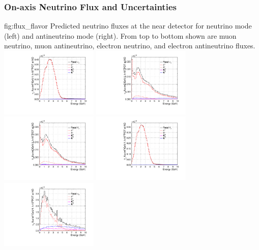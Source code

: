 \subsubsection{On-axis Neutrino Flux and Uncertainties}

\begin{dunefigure}{fig:flux_flavor}
{Predicted neutrino fluxes at the near detector for neutrino mode (left) and antineutrino mode (right). From top to bottom shown are muon neutrino, muon antineutrino, electron neutrino, and electron antineutrino fluxes.}
    \includegraphics[width=0.35\textwidth]{graphics/dune_neutrino_nd_numu.pdf}
     \includegraphics[width=0.35\textwidth]{graphics/dune_antineutrino_nd_numu.pdf}
    \includegraphics[width=0.35\textwidth]{graphics/dune_neutrino_nd_numubar.pdf}
     \includegraphics[width=0.35\textwidth]{graphics/dune_antineutrino_nd_numubar.pdf}
    \includegraphics[width=0.35\textwidth]{graphics/dune_neutrino_nd_nue.pdf}

\end{dunefigure}
